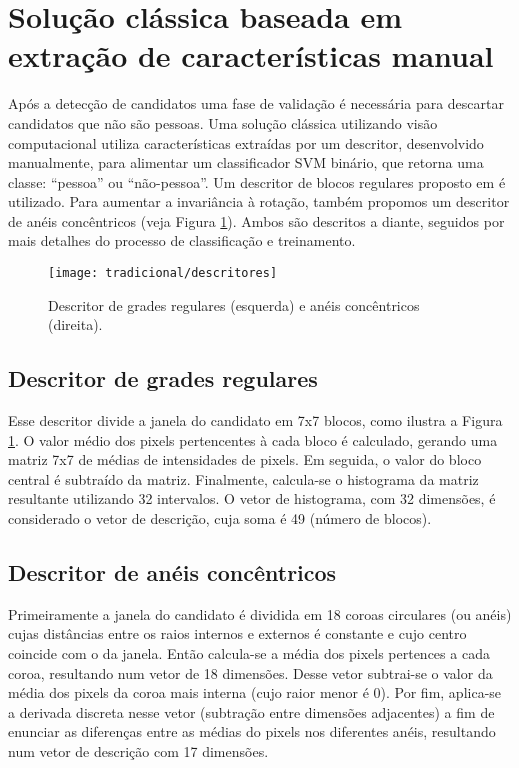 \section{Solução clássica baseada em extração de características manual}
\label{sec:classical}

    Após a detecção de candidatos uma fase de validação é necessária para descartar candidatos que não são pessoas. Uma solução clássica utilizando visão computacional \cite{rauter} utiliza características extraídas por um descritor, desenvolvido manualmente, para alimentar um classificador SVM binário, que retorna uma classe: ``pessoa'' ou ``não-pessoa''. Um descritor de blocos regulares proposto em \cite{rauter} é utilizado. Para aumentar a invariância à rotação, também propomos um descritor de anéis concêntricos (veja Figura \ref{fig:descriptors}). Ambos são descritos a diante, seguidos por mais detalhes do processo de classificação e treinamento.

    \begin{figure}
    \centering
    \texttt{[image: tradicional/descritores]}
    \caption{Descritor de grades regulares (esquerda) e anéis concêntricos (direita).}
    \label{fig:descriptors}
    \end{figure}

    \subsection{Descritor de grades regulares}
      Esse descritor divide a janela do candidato em 7x7 blocos, como ilustra a Figura \ref{fig:descriptors}. O valor médio dos pixels pertencentes à cada bloco é calculado, gerando uma matriz 7x7 de médias de intensidades de pixels. Em seguida, o valor do bloco central é subtraído da matriz. Finalmente, calcula-se o histograma da matriz resultante utilizando 32 intervalos. O vetor de histograma, com 32 dimensões, é considerado o vetor de descrição, cuja soma é 49 (número de blocos).

    \subsection{Descritor de anéis concêntricos}
       Primeiramente a janela do candidato é dividida em 18 coroas circulares (ou anéis) cujas distâncias entre os raios internos e externos é constante e cujo centro coincide com o da janela. Então calcula-se a média dos pixels pertences a cada coroa, resultando num vetor de 18 dimensões. Desse vetor subtrai-se o valor da média dos pixels da coroa mais interna (cujo raior menor é 0). Por fim, aplica-se a derivada discreta nesse vetor (subtração entre dimensões adjacentes) a fim de enunciar as diferenças entre as médias do pixels nos diferentes anéis, resultando num vetor de descrição com 17 dimensões.

